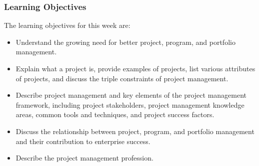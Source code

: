 \documentclass{beamer}
\begin{document}
\begin{frame}
\frametitle{Learning Objectives}
The learning objectives for this week are:\\

\begin{itemize}
\item Understand the growing need for better project, program, and portfolio management.
\item Explain what a project is, provide examples of projects, list various attributes of projects, and discuss the triple constraints of project management.
\item Describe project management and key elements of the project management framework, including project stakeholders, project management knowledge areas, common tools and techniques, and project success factors.
\item Discuss the relationship between project, program, and portfolio management and their contribution to enterprise success.
\item Describe the project management profession.
\end{itemize}
\end{frame}
\end{document}
